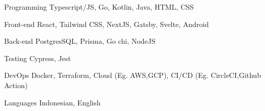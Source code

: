 

\begin{cvskills}

  \cvskill
  {Programming} %
  {Typescript/JS, Go, Kotlin, Java, HTML, CSS} %

  \cvskill
  {Front-end} %
  {React, Tailwind CSS, NextJS, Gatsby, Svelte, Android} %

  \cvskill
  {Back-end} %
  {PostgresSQL, Prisma, Go chi, NodeJS} %

  \cvskill
  {Testing} %
  {Cypress, Jest} %


  \cvskill
  {DevOps} %
  {Docker, Terraform, Cloud (Eg. AWS,GCP), CI/CD (Eg. CircleCI,Github Action)} %

  \cvskill
  {Languages} %
  {Indonesian, English} %

\end{cvskills}

